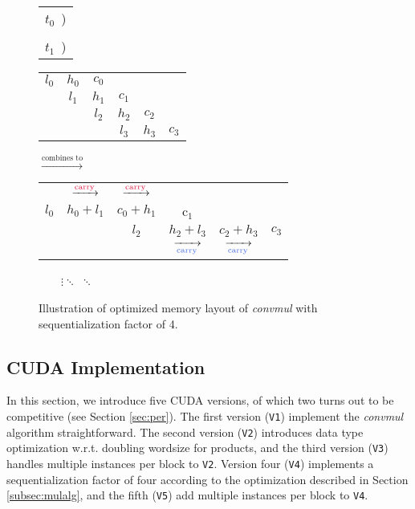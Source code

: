 \begin{figure}
  {
  \begin{center}
  \small
  \begin{tabular}{C{0.5cm}}
  \Large{\color{Crimson} $t_0$}~)\\\\
    \Large{\color{RoyalBlue} $t_1$}~)
\end{tabular}
  \begin{tabular}{cccccc}
    \color{Crimson}$l_0$ & \color{Crimson}$h_0$ & \color{Crimson}$c_0$ & & & \\
    & \color{Crimson}$l_1$ & \color{Crimson}$h_1$ & \color{Crimson}$c_1$ & & \\
    & & \color{RoyalBlue}$l_2$ & \color{RoyalBlue}$h_2$ & \color{RoyalBlue}$c_2$ & \\
    & & & \color{RoyalBlue}$l_3$ & \color{RoyalBlue}$h_3$ & \color{RoyalBlue}$c_3$
  \end{tabular}
$\xrightarrow{\text{combines to}}$
\begin{tabular}{cccccc}
     & $\xrightarrow{\scriptsize \text{\color{Crimson}carry}}$ & $\xrightarrow{\scriptsize \text{\color{Crimson}carry}}$ &  &  &  \\
    \color{Crimson}$l_0$ & \color{Crimson}$h_0 + l_1$ & \color{Crimson}$c_0 + h_1$ & \color{Crimson}c$_1$ & & \\
    & & \color{RoyalBlue}$l_2$ & \color{RoyalBlue}$h_2+l_3$ & \color{RoyalBlue}$c_2+h_3$ & \color{RoyalBlue} $c_3$\\
  & & & $\xrightarrow[\scriptsize \text{\color{RoyalBlue}carry}]{}$ & $\xrightarrow[\scriptsize \text{\color{RoyalBlue}carry}]{}$ & \\
\end{tabular}
\end{center}
}

~~~~$\vdots$\qquad\qquad\qquad\qquad\qquad $\ddots$ \qquad\qquad\qquad\qquad\qquad\qquad\qquad\qquad\qquad\qquad\qquad\qquad  $\ddots$
  \caption{\footnotesize Illustration of optimized memory layout of \textit{convmul} with sequentialization factor of 4.}
  \label{fig:muloptmem}
\end{figure}

\subsection{CUDA Implementation}
\label{subsec:mulcud}

In this section, we introduce five CUDA versions, of which two turns out to be
competitive (see Section \ref{sec:per}). The first version (\texttt{V1})
implement the \textit{convmul} algorithm straightforward. The second version
(\texttt{V2}) introduces data type optimization w.r.t. doubling wordsize for
products, and the third version (\texttt{V3}) handles multiple instances per
block to \texttt{V2}. Version four (\texttt{V4}) implements a sequentialization
factor of four according to the optimization described in Section
\ref{subsec:mulalg}, and the fifth (\texttt{V5}) add multiple instances
per block to \texttt{V4}.

